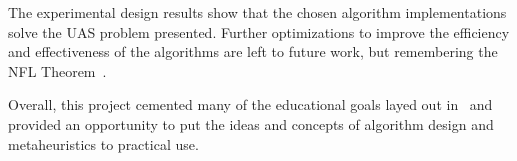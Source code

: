 \documentclass[conference]{IEEEtran}
\begin{document}
The experimental design results show that the chosen algorithm implementations
solve the UAS problem presented. Further optimizations to improve the
efficiency and effectiveness of the algorithms are left to future work, but
remembering the NFL Theorem~\cite{collet2007, wiki:nfl, igel2014}.

Overall, this project cemented many of the educational goals layed out
in~\cite{lamontSyllabus} and provided an opportunity to put the ideas and
concepts of algorithm design and metaheuristics to practical use.



\newpage
{}

\end{document}
